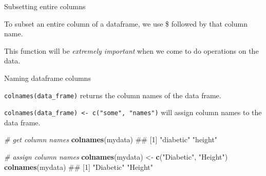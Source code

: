 \documentclass[ignorenonframetext,]{beamer}
\newenvironment{Shaded}{\begin{snugshade}}{\end{snugshade}}
\newcommand{\KeywordTok}[1]{\textcolor[rgb]{0.13,0.29,0.53}{\textbf{#1}}}
\newcommand{\StringTok}[1]{\textcolor[rgb]{0.31,0.60,0.02}{#1}}
\newcommand{\CommentTok}[1]{\textcolor[rgb]{0.56,0.35,0.01}{\textit{#1}}}
\newcommand{\OperatorTok}[1]{\textcolor[rgb]{0.81,0.36,0.00}{\textbf{#1}}}
\newcommand{\NormalTok}[1]{#1}
\begin{document}
\begin{frame}[fragile]

\begin{block}{Subsetting entire columns}

To subset an entire column of a dataframe, we use \$ followed by that
column name.

\begin{Shaded}
\end{Shaded}

\end{block}

\end{frame}

\begin{frame}[fragile]

This function will be \emph{extremely important} when we come to do
operations on the data.

\begin{block}{Naming dataframe columns}

\texttt{colnames(data\_frame)} returns the column names of the data
frame.

\texttt{colnames(data\_frame)\ \textless{}-\ c("some",\ "names")} will
assign column names to the data frame.

\end{block}

\end{frame}

\begin{frame}[fragile]

\begin{Shaded}
\begin{Highlighting}[]
\CommentTok{# get column names}
\KeywordTok{colnames}\NormalTok{(mydata)}
\NormalTok{## [1] "diabetic" "height"}
\end{Highlighting}
\end{Shaded}

\begin{Shaded}
\begin{Highlighting}[]
\CommentTok{# assign column names}
\KeywordTok{colnames}\NormalTok{(mydata) <-}\StringTok{ }\KeywordTok{c}\NormalTok{(}\StringTok{"Diabetic"}\NormalTok{, }\StringTok{"Height"}\NormalTok{)}
\KeywordTok{colnames}\NormalTok{(mydata)}
\NormalTok{## [1] "Diabetic" "Height"}
\end{Highlighting}
\end{Shaded}

\end{frame}
\end{document}

